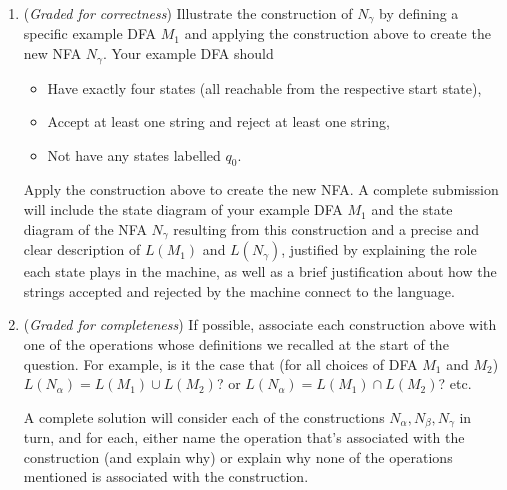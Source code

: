 \documentclass[12pt, oneside]{article}
\newcommand{\gradeCorrect}{({\it Graded for correctness}) }
\newcommand{\gradeComplete}{({\it Graded for completeness}) }
\begin{document}
\begin{enumerate}[wide, labelwidth=!, labelindent=0pt]
\begin{enumerate}
\item\gradeCorrect 
Illustrate the construction of $N_{\gamma}$ by defining a specific
example DFA $M_1$  and applying the 
construction above to create the new NFA $N_\gamma$. Your example DFA should
\begin{itemize}
    \item Have exactly four states (all reachable from the respective start state),
    \item Accept at least one string and reject at least one string, 
    \item Not have any states labelled $q_0$.
\end{itemize}
Apply the construction above to create the new NFA. A complete submission 
will include the state diagram of your example DFA $M_1$ and the state diagram of the NFA $N_\gamma$ resulting 
from this construction and a precise and clear description of $L(M_1)$ and $L(N_{\gamma})$, justified
by explaining the role each state plays in the machine, as well as a brief 
justification about how the strings accepted and rejected by the machine connect to the language.

\item \gradeComplete If possible, associate each construction above with one of the operations whose definitions we recalled at the start of the question.  For example, is it the case that (for all choices of DFA $M_1$ and $M_2$) $L(N_\alpha) = L(M_1) \cup L(M_2)$? or $L(N_\alpha) = L(M_1) \cap L(M_2)$? etc.

A complete solution will consider each of the constructions $N_\alpha, N_\beta, N_\gamma$ in turn, and for each, either name the operation that's associated with the construction (and explain why) or explain why none of the operations mentioned is associated with the construction.
\end{enumerate}

\end{enumerate}
\end{document}
